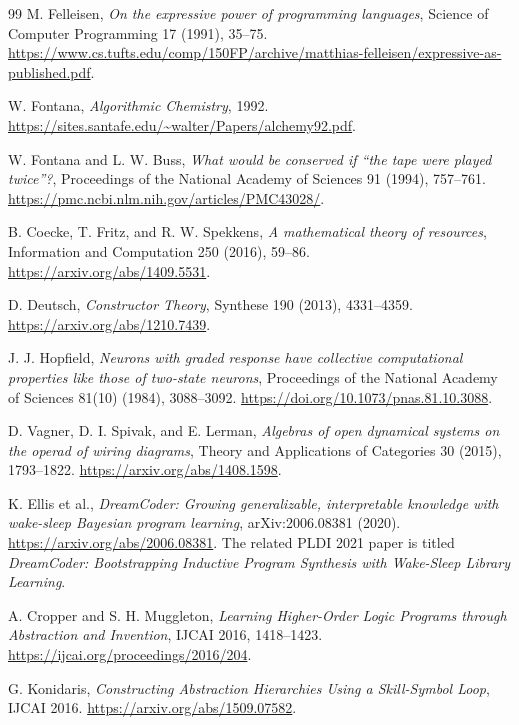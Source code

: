 \documentclass[11pt]{article}
\theoremstyle{definition}
\theoremstyle{remark}
\begin{document}
\begin{thebibliography}{99}
M. Felleisen, \emph{On the expressive power of programming languages},
Science of Computer Programming 17 (1991), 35--75.
\url{https://www.cs.tufts.edu/comp/150FP/archive/matthias-felleisen/expressive-as-published.pdf}.

W. Fontana, \emph{Algorithmic Chemistry}, 1992.
\url{https://sites.santafe.edu/~walter/Papers/alchemy92.pdf}.

W. Fontana and L. W. Buss,
\emph{What would be conserved if ``the tape were played twice''?},
Proceedings of the National Academy of Sciences 91 (1994), 757--761.
\url{https://pmc.ncbi.nlm.nih.gov/articles/PMC43028/}.

B. Coecke, T. Fritz, and R. W. Spekkens,
\emph{A mathematical theory of resources},
Information and Computation 250 (2016), 59--86.
\url{https://arxiv.org/abs/1409.5531}.

D. Deutsch, \emph{Constructor Theory}, Synthese 190 (2013), 4331--4359.
\url{https://arxiv.org/abs/1210.7439}.

J. J. Hopfield, \emph{Neurons with graded response have collective
computational properties like those of two-state neurons},
Proceedings of the National Academy of Sciences 81(10) (1984), 3088--3092.
\url{https://doi.org/10.1073/pnas.81.10.3088}.

D. Vagner, D. I. Spivak, and E. Lerman,
\emph{Algebras of open dynamical systems on the operad of wiring diagrams},
Theory and Applications of Categories 30 (2015), 1793--1822.
\url{https://arxiv.org/abs/1408.1598}.

K. Ellis et al., \emph{DreamCoder: Growing generalizable, interpretable
knowledge with wake-sleep Bayesian program learning},
arXiv:2006.08381 (2020).
\url{https://arxiv.org/abs/2006.08381}.
The related PLDI 2021 paper is titled
\emph{DreamCoder: Bootstrapping Inductive Program Synthesis with
Wake-Sleep Library Learning}.

A. Cropper and S. H. Muggleton,
\emph{Learning Higher-Order Logic Programs through Abstraction and
Invention}, IJCAI 2016, 1418--1423.
\url{https://ijcai.org/proceedings/2016/204}.

G. Konidaris, \emph{Constructing Abstraction Hierarchies Using a
Skill-Symbol Loop}, IJCAI 2016.
\url{https://arxiv.org/abs/1509.07582}.


\end{thebibliography}
\end{document}
